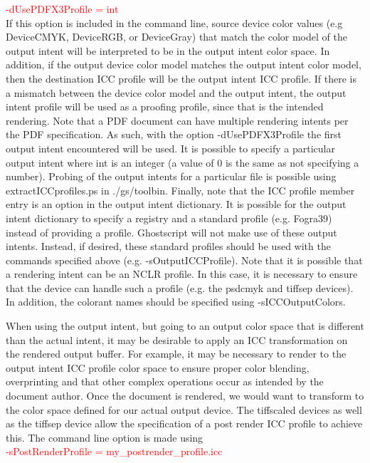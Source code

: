 \documentclass[12pt,notitlepage]{article}
\begin{document}
\textcolor{red}{-dUsePDFX3Profile = int}\\

If this option is included in the command line, source device color values (e.g DeviceCMYK, DeviceRGB, or DeviceGray) that match the color model of the output intent will be interpreted to be in the output intent color space. In addition, if the output device color model matches the output intent color model, then the destination ICC profile will be the output intent ICC profile. If there is a mismatch between the device color model and the output intent, the output intent profile will be used as a proofing profile, since that is the intended rendering. Note that a PDF document can have multiple rendering intents per the PDF specification. As such, with the option -dUsePDFX3Profile the first output intent encountered will be used. It is possible to specify a particular output intent where int is an integer (a value of 0 is the same as not specifying a number). Probing of the output intents for a particular file is possible using extractICCprofiles.ps in ./gs/toolbin. Finally, note that the ICC profile member entry is an option in the output intent dictionary. It is possible for the output intent dictionary to specify a registry and a standard profile (e.g. Fogra39) instead of providing a profile. Ghostscript will not make use of these output intents. Instead, if desired, these standard profiles should be used with the commands specified above (e.g. -sOutputICCProfile).  Note that it is possible that a rendering intent can be an NCLR profile.  In this case, it is necessary to ensure that the device can handle such a profile (e.g. the psdcmyk and tiffsep devices).  In addition, the colorant names should be specified using -sICCOutputColors.

When using the output intent, but going to an output color space that is different than the actual intent, it may be desirable to apply an ICC transformation on the rendered output buffer.  For example, it may be necessary to render to the output intent ICC profile color space to ensure proper color blending, overprinting and that other complex operations occur as intended by the document author.   Once the document is rendered, we would want to transform to the color space defined for our actual output device.   The tiffscaled devices as well as the tiffsep device allow the specification of a post render ICC profile to achieve this.   The command line option is made using\\

\textcolor{red}{-sPostRenderProfile = my\_postrender\_profile.icc}\\
\end{document}

